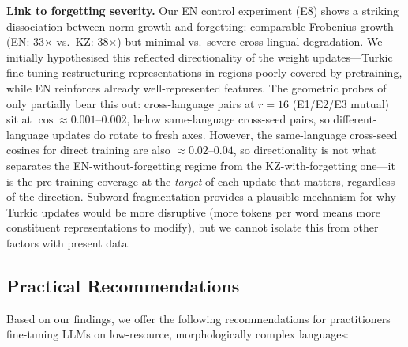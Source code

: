 \documentclass[11pt]{article}
\begin{document}
\textbf{Link to forgetting severity.} Our EN control experiment (E8) shows a striking dissociation between norm growth and forgetting: comparable Frobenius growth (EN: 33$\times$ vs.\ KZ: 38$\times$) but minimal vs.\ severe cross-lingual degradation. We initially hypothesised this reflected directionality of the weight updates---Turkic fine-tuning restructuring representations in regions poorly covered by pretraining, while EN reinforces already well-represented features. The geometric probes of  only partially bear this out: cross-language pairs at $r{=}16$ (E1/E2/E3 mutual) sit at $\cos \approx 0.001$--$0.002$, below same-language cross-seed pairs, so different-language updates do rotate to fresh axes. However, the same-language cross-seed cosines for direct training are also $\approx 0.02$--$0.04$, so directionality is not what separates the EN-without-forgetting regime from the KZ-with-forgetting one---it is the pre-training coverage at the \emph{target} of each update that matters, regardless of the direction. Subword fragmentation provides a plausible mechanism for why Turkic updates would be more disruptive (more tokens per word means more constituent representations to modify), but we cannot isolate this from other factors with present data.

\subsection{Practical Recommendations}

Based on our findings, we offer the following recommendations for practitioners fine-tuning LLMs on low-resource, morphologically complex languages:
\end{document}
